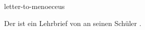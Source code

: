 \documentclass{stex}
\begin{document}
\begin{smodule}[sig=en]{letter-to-menoeceus}
\begin{sparagraph}[style=symdoc]
Der  ist ein Lehrbrief von
 an seinen Schüler .
\end{sparagraph}
\end{smodule}
\end{document}
